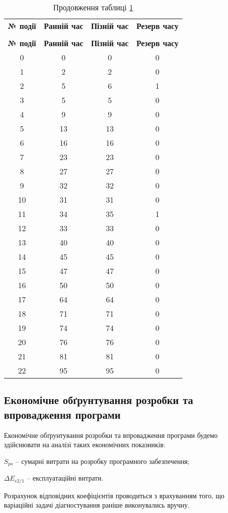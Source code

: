 {\footnotesize
\begin{longtable}{|c|c|c|c|}

\captionsetup{justification=centering}
\caption{Параметри подій мережевого графіка}\label{t:eco_3}\\
\hline
\multicolumn{1}{|c|}{\textbf{№ події}}&
\multicolumn{1}{c|}{\textbf{Ранній час}}&
\multicolumn{1}{c|}{\textbf{Пізній час}}&
\multicolumn{1}{c|}{\textbf{Резерв часу}}\\\hline

\endfirsthead
\caption*{\hfill Продовження таблиці \ref{t:eco_3}}\\\hline

\multicolumn{1}{|c|}{\textbf{№ події}}&
\multicolumn{1}{c|}{\textbf{Ранній час}}&
\multicolumn{1}{c|}{\textbf{Пізній час}}&
\multicolumn{1}{c|}{\textbf{Резерв часу}}\\\hline
\endhead

0 & 0 & 0 & 0\\ \hline
1 & 2 & 2 & 0\\ \hline
2 & 5 & 6 & 1\\ \hline
3 & 5 & 5 & 0\\ \hline
4 & 9 & 9 & 0\\ \hline
5 & 13 & 13 & 0\\ \hline
6 & 16 & 16 & 0\\ \hline
7 & 23 & 23 & 0\\ \hline
8 & 27 & 27 & 0\\ \hline
9 & 32 & 32 & 0\\ \hline
10 & 31 & 31 & 0\\ \hline
11 & 34 & 35 & 1\\ \hline
12 & 33 & 33 & 0\\ \hline
13 & 40 & 40 & 0\\ \hline
14 & 45 & 45 & 0\\ \hline
15 & 47 & 47 & 0\\ \hline
16 & 50 & 50 & 0\\ \hline
17 & 64 & 64 & 0\\ \hline
18 & 71 & 71 & 0\\ \hline
19 & 74 & 74 & 0\\ \hline
20 & 76 & 76 & 0\\ \hline
21 & 81 & 81 & 0\\ \hline
22 & 95 & 95 & 0\\ \hline

\end{longtable}}

\subsection{Економічне обґрунтування розробки та впровадження програми}
Економічне обґрунтування розробки та впровадження програми будемо здійснювати на аналізі таких економічних показників:
\par $S_{po}$ -- сумарні витрати на розробку програмного забезпечення;
\par $\Delta{E_{e2/1}}$ -- експлуатаційні витрати.
\par Розрахунок відповідних коефіцієнтів проводиться з врахуванням того, що варіаційні задачі діагностування раніше виконувались вручну.

